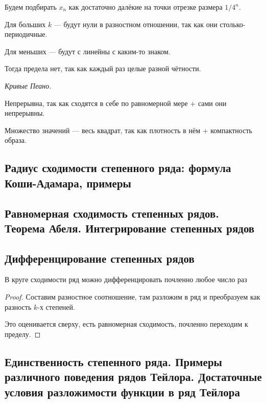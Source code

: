\documentclass[12pt, a4paper, oneside]{memoir}
\begin{document}
Будем подбирать $x_n$ как достаточно далёкие на точки отрезке размера $1/4^n$.

Для больших $k$ — будут нули в разностном отношении, так как они столько-периодичные.

Для меньших — будут с линейны с каким-то знаком.

Тогда предела нет, так как каждый раз целые разной чётности.


\textit{Кривые Пеано.}

Непрерывна, так как сходятся в себе по равномерной мере + сами они непрерывны.

Множество значений — весь квадрат, так как плотность в нём + компактность образа.



\subsection{Радиус сходимости степенного ряда: формула Коши-Адамара, примеры}


\subsection{Равномерная сходимость степенных рядов.
Теорема Абеля. Интегрирование степенных рядов}

\subsection{Дифференцирование степенных рядов}


\begin{theorem}

    В круге сходимости ряд можно дифференцировать почленно любое число раз

    \begin{proof}
        Составим разностное соотношение, там разложим в ряд и преобразуем как разность $k$-х степеней.

        Это оценивается сверху, есть равномерная сходимость, почленно переходим к пределу.
    \end{proof}
\end{theorem}


\subsection{Единственность степенного ряда. Примеры различного поведения рядов Тейлора.
Достаточные условия разложимости функции в ряд Тейлора}
\end{document}
